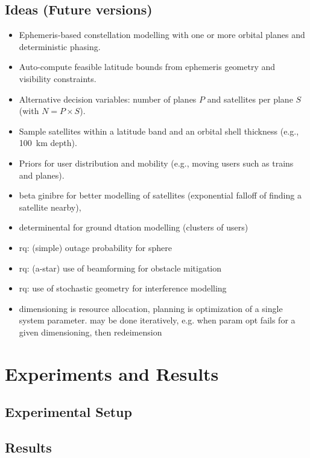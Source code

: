 \documentclass[11pt,a4paper]{article}
\begin{document}
\subsection{Ideas (Future versions)}
\begin{itemize}
    \item Ephemeris-based constellation modelling with one or more orbital planes and deterministic phasing.
    \item Auto-compute feasible latitude bounds from ephemeris geometry and visibility constraints.
    \item Alternative decision variables: number of planes $P$ and satellites per plane $S$ (with $N = P \times S$).
    \item Sample satellites within a latitude band and an orbital shell thickness (e.g., 100~km depth).
    \item Priors for user distribution and mobility (e.g., moving users such as trains and planes).
    \item beta ginibre for better modelling of satellites (exponential falloff of finding a satellite nearby), 
    \item determinental for ground dtation modelling (clusters of users)
    
    \item rq: (simple) outage probability for sphere 
    \item rq: (a-star) use of beamforming for obstacle mitigation
    \item rq: use of stochastic geometry for interference modelling

    \item dimensioning is resource allocation, planning is optimization of a single system parameter. may be done iteratively, e.g. when param opt fails for a given dimensioning, then redeimension
\end{itemize}


\section{Experiments and Results}
\subsection{Experimental Setup}

\subsection{Results}
\end{document}
